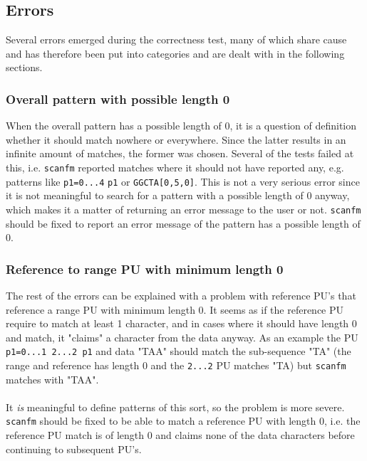 \documentclass[12pt]{article}
\newcommand{\textapprox}{\raisebox{0.5ex}{\texttildelow}}
\newcommand{\sfm}{\texttt{scanfm} }
\newcommand{\pu}{PU }
\newcommand{\pus}{PU's }
\newcommand{\pusp}{PU's. }
\begin{document}
\subsection{Errors}
Several errors emerged during the correctness test, many of which share cause and has therefore been put into
categories and are dealt with in the following sections.
\subsubsection{Overall pattern with possible length 0}
When the overall pattern has a possible length of 0, it is a question of definition whether it should match nowhere or
everywhere. Since the latter results in an infinite amount of matches, the former was chosen.
Several of the tests failed at this, i.e. \sfm reported matches where it should not have reported any, e.g.
patterns like \texttt{p1=0...4} \textapprox \texttt{p1} or \texttt{GGCTA[0,5,0]}.
This is not a very serious error since it is not meaningful to search for a pattern with a possible length of 0 anyway,
which makes it a matter of returning an error message to the user or not. \sfm should be fixed to report an error
message of the pattern has a possible length of 0.
\subsubsection{Reference to range \pu with minimum length 0}
The rest of the errors can be explained with a problem with reference \pus that reference a range \pu with minimum
length 0. It seems as if the reference \pu require to match at least 1 character, and in cases where it should have 
length 0 and match, it "claims" a character from the data anyway. As an example the \pu \texttt{p1=0...1 2...2 p1} and
data "TAA" should match the sub-sequence "TA" (the range and reference has length 0 and the \texttt{2...2} \pu
matches "TA) but \sfm matches with "TAA". \\ \\
It \emph{is} meaningful to define patterns of this sort, so the problem is more severe. \sfm should be fixed to
be able to match a reference \pu with length 0, i.e. the reference \pu match is of length 0 and claims none of the
data characters before continuing to subsequent \pusp
\end{document}
